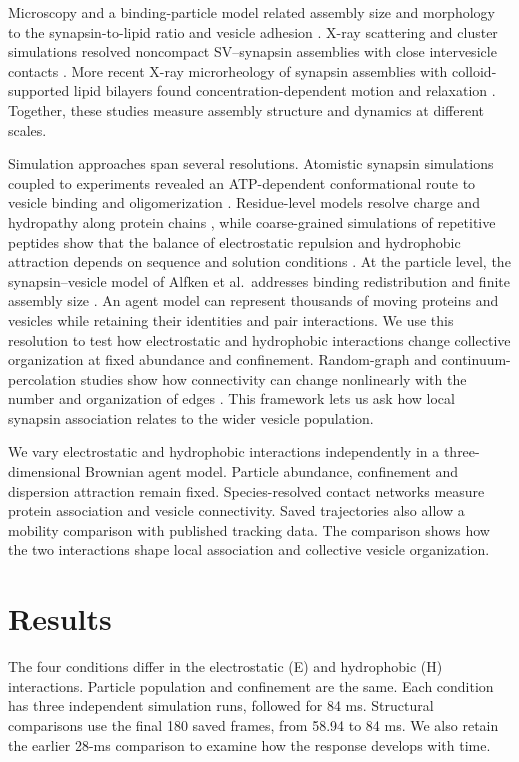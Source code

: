 \documentclass[11pt,letterpaper]{article}
\begin{document}
Microscopy and a binding-particle model related assembly size and
morphology to the synapsin-to-lipid ratio and vesicle adhesion
\cite{Alfken2024}. X-ray scattering and cluster simulations resolved
noncompact SV--synapsin assemblies with close intervesicle contacts
\cite{Neuhaus2024}. More recent X-ray microrheology of synapsin assemblies
with colloid-supported lipid bilayers found concentration-dependent motion
and relaxation \cite{Czajka2026}. Together, these studies measure assembly
structure and dynamics at different scales.

Simulation approaches span several resolutions. Atomistic synapsin
simulations coupled to experiments revealed an ATP-dependent
conformational route to vesicle binding and oligomerization
\cite{Orlando2014}. Residue-level models resolve charge and hydropathy
along protein chains \cite{Dignon2018}, while coarse-grained simulations
of repetitive peptides show that the balance of electrostatic repulsion
and hydrophobic attraction depends on sequence and solution conditions
\cite{Yang2024}. At the particle level, the synapsin--vesicle model of
Alfken et al.\ addresses binding redistribution and finite assembly size
\cite{Alfken2024}. An agent model can represent thousands of moving
proteins and vesicles while retaining their identities and pair interactions.
We use this resolution to test how electrostatic and hydrophobic interactions
change collective organization at fixed abundance and confinement. Random-graph and
continuum-percolation studies show how connectivity can change
nonlinearly with the number and organization of edges
\cite{NewmanStrogatzWatts2001,DallChristensen2002}. This framework lets us
ask how local synapsin association relates to the wider vesicle population.

We vary electrostatic and hydrophobic interactions independently in a
three-dimensional Brownian agent model. Particle abundance, confinement
and dispersion attraction remain fixed. Species-resolved contact networks
measure protein association and vesicle connectivity. Saved trajectories
also allow a mobility comparison with published tracking data. The
comparison shows how the two interactions shape local association and
collective vesicle organization.

\section{Results}
The four conditions differ in the electrostatic (E) and hydrophobic (H)
interactions. Particle population and confinement are the same. Each
condition has three independent simulation runs, followed for 84 ms.
Structural comparisons use the final 180 saved frames, from 58.94 to
84 ms. We also retain the earlier 28-ms comparison to examine how the
response develops with time.
\end{document}
